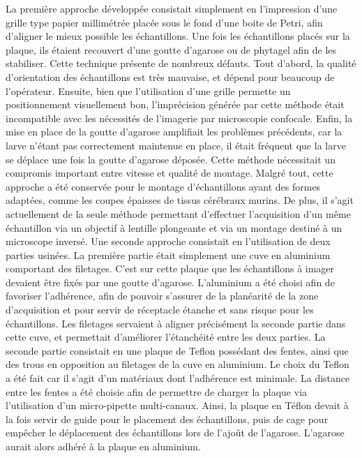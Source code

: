 \documentclass[\main/main.tex]{subfiles}
\begin{document}
%
La première approche développée consistait simplement en l'impression d'une grille type papier millimétrée placée sous le fond d'une boite de Petri, afin d'aligner le mieux possible les échantillons.
%
Une fois les échantillons placés sur la plaque, ils étaient recouvert d'une goutte d'agarose ou de phytagel afin de les stabiliser.
%
Cette technique présente de nombreux défauts. Tout d'abord, la qualité d'orientation des échantillons est très mauvaise, et dépend pour beaucoup de l'opérateur.
%
Ensuite, bien que l'utilisation d'une grille permette un positionnement visuellement bon, l'imprécision générée par cette méthode était incompatible avec les nécessités de l'imagerie par microscopie confocale.
%
Enfin, la mise en place de la goutte d'agarose amplifiait les problèmes précédents, car la larve n'étant pas correctement maintenue en place, il était fréquent que la larve se déplace une fois la goutte d'agarose déposée.
%
Cette méthode nécessitait un compromis important entre vitesse et qualité de montage.
%
Malgré tout, cette approche a été conservée pour le montage d'échantillons ayant des formes adaptées, comme les coupes épaisses de tissus cérébraux murins.
%
De plus, il s'agit actuellement de la seule méthode permettant d'effectuer l'acquisition d'un même échantillon via un objectif à lentille plongeante et via un montage destiné à un microscope inversé.
%
Une seconde approche consistait en l'utilisation de deux parties usinées.
%
La première partie était simplement une cuve en aluminium comportant des filetages.
%
C'est sur cette plaque que les échantillons à imager devaient être fixés par une goutte d'agarose.
%
L'aluminium a été choisi afin de favoriser l'adhérence, afin de pouvoir s'assurer de la planéarité de la zone d'acquisition et pour servir de réceptacle étanche et sans risque pour les échantillons.
%
Les filetages servaient à aligner précisément la seconde partie dans cette cuve, et permettait d'améliorer l'étanchéité entre les deux parties.
%
La seconde partie consistait en une plaque de Teflon possédant des fentes, ainsi que des trous en opposition au filetages de la cuve en aluminium.
%
Le choix du Teflon a été fait car il s'agit d'un matériaux dont l'adhérence est minimale.
%
La distance entre les fentes a été choisie afin de permettre de charger la plaque via l'utilisation d'un micro-pipette multi-canaux.
%
Ainsi, la plaque en Téflon devait à la fois servir de guide pour le placement des échantillons, puis de cage pour empêcher le déplacement des échantillons lors de l'ajoût de l'agarose.
%
L'agarose aurait alors adhéré à la plaque en aluminium.
\end{document}
